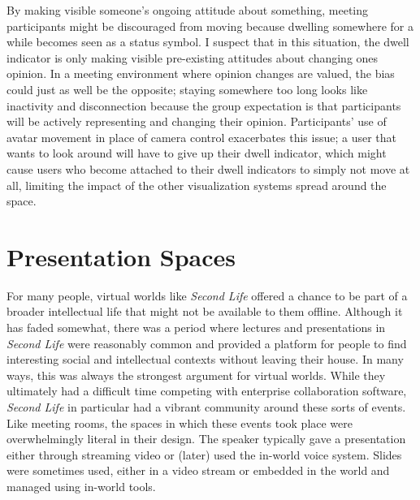By making visible someone's ongoing attitude about something, meeting participants might be discouraged from moving because dwelling somewhere for a while becomes seen as a status symbol. I suspect that in this situation, the dwell indicator is only making visible pre-existing attitudes about changing ones opinion. In a meeting environment where opinion changes are valued, the bias could just as well be the opposite; staying somewhere too long looks like inactivity and disconnection because the group expectation is that participants will be actively representing and changing their opinion. Participants' use of avatar movement in place of camera control exacerbates this issue; a user that wants to look around will have to give up their dwell indicator, which might cause users who become attached to their dwell indicators to simply not move at all, limiting the impact of the other visualization systems spread around the space. 




\section{Presentation Spaces}


For many people, virtual worlds like \emph{Second Life} offered a chance to be part of a broader intellectual life that might not be available to them offline. Although it has faded somewhat, there was a period where lectures and presentations in \emph{Second Life} were reasonably common and provided a platform for people to find interesting social and intellectual contexts without leaving their house. In many ways, this was always the strongest argument for virtual worlds. While they ultimately had a difficult time competing with enterprise collaboration software, \emph{Second Life} in particular had a vibrant community around these sorts of events. Like meeting rooms, the spaces in which these events took place were overwhelmingly literal in their design.  The speaker typically gave a presentation either through streaming video or (later) used the in-world voice system. Slides were sometimes used, either in a video stream or embedded in the world and managed using in-world tools.

